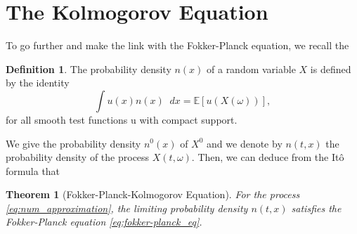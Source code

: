 \documentclass{article}
\newcommand{\E}[1]{\mathbb{E}\left[ #1 \right]}
\newcommand{\diff}{\mathop{}\!d}
\theoremstyle{definition}
\newtheorem{defn}{Definition}[section]
\theoremstyle{plain}
\newtheorem{thm}{Theorem}[section]
\theoremstyle{remark}
\begin{document}
\section{The Kolmogorov Equation}
To go further and make the link with the Fokker-Planck equation, we recall the
\begin{defn}
	The probability density $ n(x) $ of a random variable $ X $ is defined by the identity
	\[\int u(x)n(x)\diff x=\E{u(X(\omega))}, \]
	for all smooth test functions u with compact support.
\end{defn} 

We give the probability density $ n^0(x) $ of $ X^0 $ and we denote by $ n(t,x) $ the probability density of the process $ X(t,\omega) $. Then, we can deduce from the It\^o formula that 
\begin{thm}[Fokker-Planck-Kolmogorov Equation]
	For the process \eqref{eq:num_approximation}, the 	limiting probability density $ n(t,x) $ satisfies the Fokker-Planck equation \eqref{eq:fokker-planck_eq}.
\end{thm}
\end{document}
